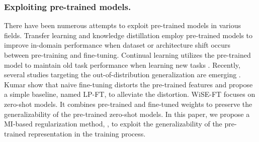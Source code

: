 \subsubsection{Exploiting pre-trained models.}
There have been numerous attempts to exploit pre-trained models in various fields.
Transfer learning \cite{xuhong2018l2sp,li2019delta} and knowledge distillation \cite{ahn2019vid,tian2019crd} employ pre-trained models to improve in-domain performance when dataset or architecture shift occurs between pre-training and fine-tuning.
Continual learning utilizes the pre-trained model to maintain old task performance when learning new tasks \cite{li2017lwf}.
Recently, several studies targeting the out-of-distribution generalization are emerging \cite{kumar2022iclr_finetuning_distort,wortsman2021robust}. 
Kumar \etal \cite{kumar2022iclr_finetuning_distort} show that naive fine-tuning distorts the pre-trained features and propose a simple baseline, named LP-FT, to alleviate the distortion. 
WiSE-FT \cite{wortsman2021robust} focuses on zero-shot models. It combines pre-trained and fine-tuned weights to preserve the generalizability of the pre-trained zero-shot models.
In this paper, we propose a MI-based regularization method, \method{}, to exploit the generalizability of the pre-trained representation in the training process.

